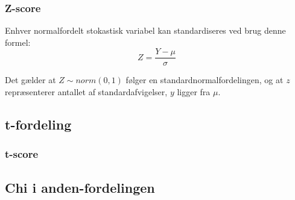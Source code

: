 \subsubsection{Z-score}
Enhver normalfordelt stokastisk variabel kan standardiseres ved brug denne formel:
$$Z=\frac{Y-\mu}{\sigma}$$

Det gælder at $Z \sim norm(0,1)$ følger en standardnormalfordelingen, og at $z$ repræsenterer antallet af standardafvigelser, $y$ ligger fra $\mu$. 

\subsection{t-fordeling}

\subsubsection{t-score}

\subsection{Chi i anden-fordelingen}

